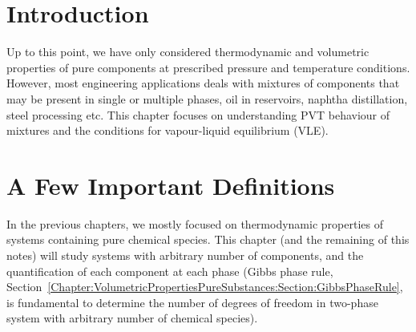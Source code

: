 \localtableofcontents
   

\section{Introduction}\label{Chapter:VLE:Section:Introduction}
Up to this point, we have only considered thermodynamic and volumetric properties of pure components at prescribed pressure and temperature conditions. However, most engineering applications deals with mixtures of components that may be present in single or multiple phases, \eg oil in reservoirs, naphtha distillation, steel processing etc. This chapter focuses on understanding PVT behaviour of mixtures and the conditions for vapour-liquid equilibrium (VLE).



\section{A Few Important Definitions}
In the previous chapters, we mostly focused on thermodynamic properties of systems containing pure chemical species. This chapter (and the remaining of this notes) will study systems with arbitrary number of components, and the quantification of each component at each phase (Gibbs phase rule, Section~\ref{Chapter:VolumetricPropertiesPureSubstances:Section:GibbsPhaseRule}, is fundamental to determine the number of degrees of freedom in two-phase system with arbitrary number of chemical species).

